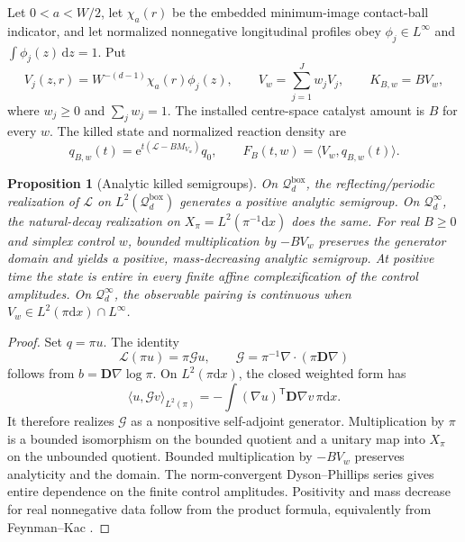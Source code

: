 \documentclass[aps,physrev,onecolumn,amsmath,amssymb,longbibliography]{revtex4-2}
\newcommand{\dd}{\mathrm d}
\newcommand{\e}{\mathrm e}
\newcommand{\Lfree}{\mathcal L}
\newcommand{\Qbox}{\mathcal Q_d^{\mathrm{box}}}
\newcommand{\Qinf}{\mathcal Q_d^{\infty}}
\newtheorem{proposition}[theorem]{Proposition}
\begin{document}
Let \(0<a<W/2\), let \(\chi_a(r)\) be the embedded minimum-image contact-ball
indicator, and let normalized nonnegative longitudinal profiles obey
\(\phi_j\in L^\infty\) and \(\int\phi_j(z)\,\dd z=1\).  Put
\begin{equation}
 V_j(z,r)=W^{-(d-1)}\chi_a(r)\phi_j(z),\qquad
 V_w=\sum_{j=1}^Jw_jV_j,\qquad K_{B,w}=BV_w,
 \label{eq:supp-profiles}
\end{equation}
where \(w_j\ge0\) and \(\sum_jw_j=1\).  The installed centre-space catalyst
amount is \(B\) for every \(w\).  The killed state and normalized reaction
density are
\begin{equation}
 q_{B,w}(t)=\e^{t(\Lfree-BM_{V_w})}q_0,\qquad
 F_B(t,w)=\langle V_w,q_{B,w}(t)\rangle .
 \label{eq:supp-state}
\end{equation}

\begin{proposition}[Analytic killed semigroups]
\label{prop:supp-analytic}
On \(\Qbox\), the reflecting/periodic realization of \(\Lfree\) on
\(L^2(\Qbox)\) generates a positive analytic semigroup.  On \(\Qinf\), the
natural-decay realization on \(X_\pi=L^2(\pi^{-1}\dd x)\) does the same.
For real \(B\ge0\) and simplex control \(w\), bounded multiplication by
\(-BV_w\) preserves the generator domain and yields a positive,
mass-decreasing analytic semigroup.  At positive time the state is entire in
every finite affine complexification of the control amplitudes.  On
\(\Qinf\), the observable pairing is continuous when
\(V_w\in L^2(\pi\dd x)\cap L^\infty\).
\end{proposition}

\begin{proof}
Set \(q=\pi u\).  The identity
\begin{equation}
 \Lfree(\pi u)=\pi\mathcal Gu,\qquad
 \mathcal G=\pi^{-1}\nabla\!\cdot(\pi\bm D\nabla)
 \label{eq:supp-similarity}
\end{equation}
follows from \(b=\bm D\nabla\log\pi\).  On \(L^2(\pi\dd x)\), the closed
weighted form has
\begin{equation}
 \langle u,\mathcal Gv\rangle_{L^2(\pi)}
 =-\int(\nabla u)^{\mathsf T}\bm D\nabla v\,\pi\dd x.
 \label{eq:supp-form}
\end{equation}
It therefore realizes \(\mathcal G\) as a nonpositive self-adjoint generator.
Multiplication by \(\pi\) is a bounded isomorphism on the bounded quotient and
a unitary map into \(X_\pi\) on the unbounded quotient.  Bounded multiplication
by \(-BV_w\) preserves analyticity and the domain.  The norm-convergent
Dyson--Phillips series gives entire dependence on the finite control
amplitudes.  Positivity and mass decrease for real nonnegative data follow
from the product formula, equivalently from Feynman--Kac
\cite{bressloff2022feynmanKac,grebenkov2020multiple}.
\end{proof}
\end{document}
